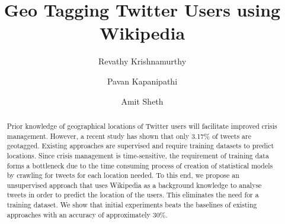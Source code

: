 \documentclass[runningheads,a4paper]{llncs}
\begin{document}
\mainmatter  %

\title{Geo Tagging Twitter Users using Wikipedia}


\author{Revathy Krishnamurthy\and Pavan Kapanipathi\and Amit Sheth}



\maketitle

\begin{abstract}
Prior knowledge of geographical locations of Twitter users will facilitate improved crisis management. However, a recent study has shown that only 3.17\% of tweets are geotagged. Existing approaches are supervised and require training datasets to predict locations. Since crisis management is time-sensitive, the requirement of training data forms a bottleneck due to the time consuming process of creation of statistical models by crawling for tweets for each location needed. To this end, we propose an unsupervised approach that uses Wikipedia as a background knowledge to analyse tweets in order to predict the location of the users. This eliminates the need for a training dataset. We show that initial experiments beats the baselines of existing approaches with an accuracy of approximately 30\%.

\end{abstract}


 





\end{document}

